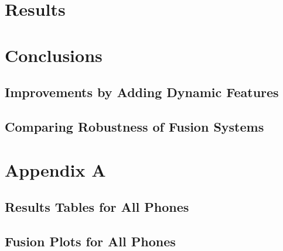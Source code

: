 \documentclass[11pt,a4paper]{tesis}
\begin{document}
\chapter{Results}
	

\chapter{Conclusions}
	\section{Improvements by Adding Dynamic Features}
	\section{Comparing Robustness of Fusion Systems}

\chapter{Appendix A}
	\section{Results Tables for All Phones}
		
	\section{Fusion Plots for All Phones}
		

\printbibliography
\end{document}
